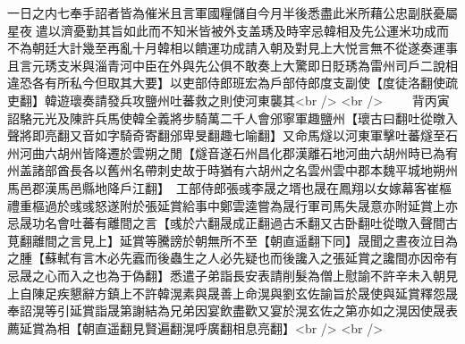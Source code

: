 一日之内七奉手詔者皆為催米且言軍國糧儲自今月半後悉盡此米所藉公忠副朕憂屬星夜遣以濟憂勤其旨如此而不知米皆被外支盖琇及時宰忌韓相及先公運米功成而不為朝廷大計幾至再亂十月韓相以饋運功成請入朝及對見上大悦言無不從遂奏運事且言元琇支米與淄青河中臣在外與先公俱不敢奏上大驚即日貶琇為雷州司戶二說相違恐各有所私今但取其大要】以吏部侍郎班宏為戶部侍郎度支副使【度徒洛翻使疏吏翻】韓遊瓌奏請發兵攻鹽州吐蕃救之則使河東襲其<br />
<br />
　　背丙寅詔駱元光及陳許兵馬使韓全義將步騎萬二千人會邠寧軍趣鹽州【瓌古曰翻吐從暾入聲將即亮翻又音如字騎奇寄翻邠卑旻翻趣七喻翻】又命馬燧以河東軍擊吐蕃燧至石州河曲六胡州皆降遷於雲朔之閒【燧音遂石州昌化郡漢離石地河曲六胡州時已為宥州盖諸部酋長各以舊州名帶刺史故于時猶有六胡州之名雲州雲中郡本魏平城地朔州馬邑郡漢馬邑縣地降戶江翻】　工部侍郎張彧李晟之壻也晟在鳳翔以女嫁幕客崔樞禮重樞過於彧彧怒遂附於張延賞給事中鄭雲逵嘗為晟行軍司馬失晟意亦附延賞上亦忌晟功名會吐蕃有離間之言【彧於六翻晟成正翻過古禾翻又古卧翻吐從暾入聲間古莧翻離間之言見上】延賞等騰謗於朝無所不至【朝直遥翻下同】晟聞之晝夜泣目為之腫【蘇軾有言木必先蠧而後蟲生之人必先疑也而後讒入之張延賞之讒間亦因帝有忌晟之心而入之也為于偽翻】悉遣子弟詣長安表請削髮為僧上慰諭不許辛未入朝見上自陳足疾懇辭方鎮上不許韓滉素與晟善上命滉與劉玄佐諭旨於晟使與延賞釋怨晟奉詔滉等引延賞詣晟第謝結為兄弟因宴飲盡歡又宴於滉玄佐之第亦如之滉因使晟表薦延賞為相【朝直遥翻見賢遍翻滉呼廣翻相息亮翻】<br />
<br />
